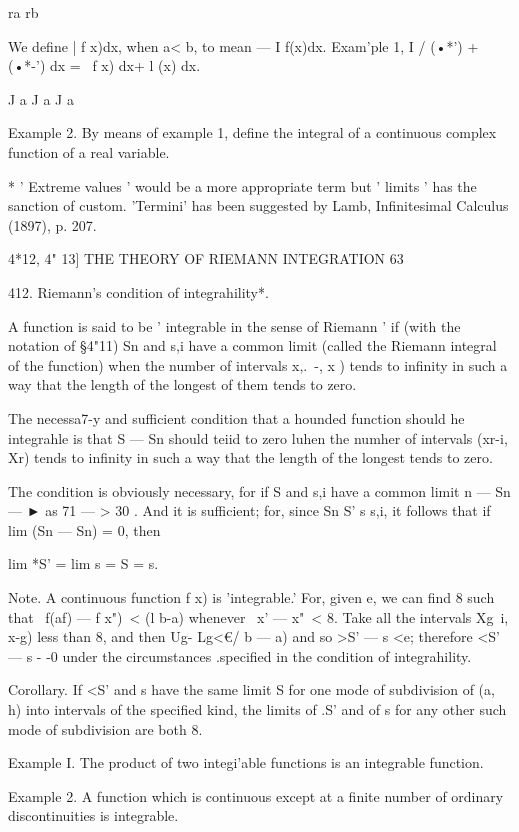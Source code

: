 ra rb

We define | f x)dx, when a< b, to mean — I f(x)dx. Exam'ple 1, I /
(•*') + (•*-') dx = \ f x) dx+ l (x) dx.

J a J a J a

Example 2. By means of example 1, define the integral of a continuous
complex function of a real variable.

* ' Extreme values ' would be a more appropriate term but ' limits '
has the sanction of custom. 'Termini' has been suggested by Lamb,
Infinitesimal Calculus (1897), p. 207.



4*12, 4" 13] THE THEORY OF RIEMANN INTEGRATION 63

412. Riemann's condition of integrahility*.

A function is said to be ' integrable in the sense of Riemann ' if
(with the notation of §4"11) Sn and s,i have a common limit (called
the Riemann integral of the function) when the number of intervals
x,.\ -, x ) tends to infinity in such a way that the length of the
longest of them tends to zero.

The necessa7-y and sufficient condition that a hounded function should
he integrahle is that S — Sn should teiid to zero luhen the numher of
intervals (xr-i, Xr) tends to infinity in such a way that the length
of the longest tends to zero.

The condition is obviously necessary, for if S and s,i have a common
limit n — Sn — ► as 71 — > 30 . And it is sufficient; for, since Sn
S' s s,i, it follows that if lim (Sn — Sn) = 0, then

lim *S' = lim s = S = s.

Note. A continuous function f x) is 'integrable.' For, given e, we can
find 8 such that \ f(af) — f x")\ < (l b-a) whenever \ x' — x"\ < 8.
Take all the intervals Xg\ i, x-g) less than 8, and then Ug- Lg<€/ b —
a) and so >S' — s <e; therefore <S' — s - -0 under the circumstances
.specified in the condition of integrahility.

Corollary. If <S' and s have the same limit S for one mode of
subdivision of (a, h) into intervals of the specified kind, the limits
of .S' and of s for any other such mode of subdivision are both 8.

Example I. The product of two integi'able functions is an integrable
function.

Example 2. A function which is continuous except at a finite number of
ordinary discontinuities is integrable.

